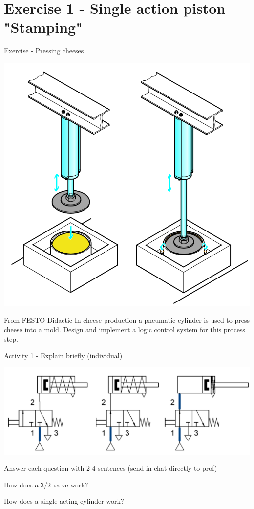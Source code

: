 \documentclass[presentation,aspectratio=1610]{beamer}
\begin{document}
\section{Exercise 1 - Single action piston "Stamping"}
\label{sec:org204bbc8}
\begin{frame}[label={sec:org20570d2}]{Exercise - Pressing cheeses}
\begin{center}
\includegraphics[width=0.4\linewidth]{../../figures/cheese-stamping.png}
\end{center}
{\tiny From FESTO Didactic}
In cheese production a pneumatic cylinder is used to press cheese into a mold. Design and implement a logic control system for this process step.
\end{frame}

\begin{frame}[label={sec:org44c56d6}]{Activity 1 - Explain briefly (individual)}
\begin{center}
\includegraphics[width=0.5\linewidth]{../../figures/valve-32-example.png}
\end{center}

Answer each question with 2-4 sentences (send in chat directly to prof)

\begin{block}{How does a 3/2 valve work?}
\end{block}
\begin{block}{How does a single-acting cylinder work?}
\end{block}
\end{frame}
\end{document}

